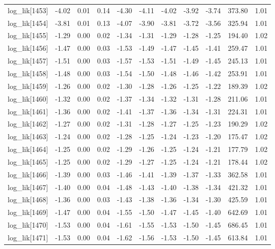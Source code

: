 \begin{table}[ht]
\begin{tabular}{rrrrrrrrrrr}
  log\_lik[1453] & -4.02 & 0.01 & 0.14 & -4.30 & -4.11 & -4.02 & -3.92 & -3.74 & 373.80 & 1.01 \\ 
  log\_lik[1454] & -3.81 & 0.01 & 0.13 & -4.07 & -3.90 & -3.81 & -3.72 & -3.56 & 325.94 & 1.01 \\ 
  log\_lik[1455] & -1.29 & 0.00 & 0.02 & -1.34 & -1.31 & -1.29 & -1.28 & -1.25 & 194.40 & 1.02 \\ 
  log\_lik[1456] & -1.47 & 0.00 & 0.03 & -1.53 & -1.49 & -1.47 & -1.45 & -1.41 & 259.47 & 1.01 \\ 
  log\_lik[1457] & -1.51 & 0.00 & 0.03 & -1.57 & -1.53 & -1.51 & -1.49 & -1.45 & 245.13 & 1.01 \\ 
  log\_lik[1458] & -1.48 & 0.00 & 0.03 & -1.54 & -1.50 & -1.48 & -1.46 & -1.42 & 253.91 & 1.01 \\ 
  log\_lik[1459] & -1.26 & 0.00 & 0.02 & -1.30 & -1.28 & -1.26 & -1.25 & -1.22 & 189.39 & 1.02 \\ 
  log\_lik[1460] & -1.32 & 0.00 & 0.02 & -1.37 & -1.34 & -1.32 & -1.31 & -1.28 & 211.06 & 1.01 \\ 
  log\_lik[1461] & -1.36 & 0.00 & 0.02 & -1.41 & -1.37 & -1.36 & -1.34 & -1.31 & 224.31 & 1.01 \\ 
  log\_lik[1462] & -1.27 & 0.00 & 0.02 & -1.31 & -1.28 & -1.27 & -1.25 & -1.23 & 190.29 & 1.02 \\ 
  log\_lik[1463] & -1.24 & 0.00 & 0.02 & -1.28 & -1.25 & -1.24 & -1.23 & -1.20 & 175.47 & 1.02 \\ 
  log\_lik[1464] & -1.25 & 0.00 & 0.02 & -1.29 & -1.26 & -1.25 & -1.24 & -1.21 & 177.79 & 1.02 \\ 
  log\_lik[1465] & -1.25 & 0.00 & 0.02 & -1.29 & -1.27 & -1.25 & -1.24 & -1.21 & 178.44 & 1.02 \\ 
  log\_lik[1466] & -1.39 & 0.00 & 0.03 & -1.46 & -1.41 & -1.39 & -1.37 & -1.33 & 362.58 & 1.01 \\ 
  log\_lik[1467] & -1.40 & 0.00 & 0.04 & -1.48 & -1.43 & -1.40 & -1.38 & -1.34 & 421.32 & 1.01 \\ 
  log\_lik[1468] & -1.36 & 0.00 & 0.03 & -1.43 & -1.38 & -1.36 & -1.34 & -1.30 & 425.59 & 1.01 \\ 
  log\_lik[1469] & -1.47 & 0.00 & 0.04 & -1.55 & -1.50 & -1.47 & -1.45 & -1.40 & 642.69 & 1.01 \\ 
  log\_lik[1470] & -1.53 & 0.00 & 0.04 & -1.61 & -1.55 & -1.53 & -1.50 & -1.45 & 686.45 & 1.01 \\ 
  log\_lik[1471] & -1.53 & 0.00 & 0.04 & -1.62 & -1.56 & -1.53 & -1.50 & -1.45 & 613.84 & 1.01 \\ 

\end{tabular}
\end{table}
